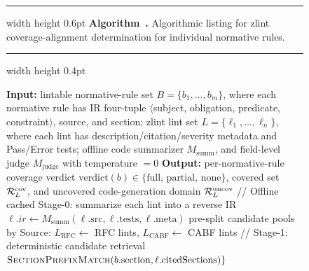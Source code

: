 %
\begin{figure}[tb]
\setlength{\parskip}{0pt}
\makeatletter
{}%
\makeatother
{}
\label{alg:coverage}
\hrule width \linewidth height 0.6pt\relax
\vspace{1pt}
\nointerlineskip
\noindent\textbf{Algorithm~\thealgorithm.} Algorithmic listing for zlint
coverage-alignment determination for individual normative rules.
\par
\vspace{1pt}
\nointerlineskip
\hrule width \linewidth height 0.4pt\relax
\nointerlineskip
\scriptsize
\begin{algorithmic}[1]
\Statex \textbf{Input:} lintable normative-rule set $B=\{b_1,\dots,b_m\}$, where each normative rule has
  IR four-tuple $\langle$subject, obligation, predicate, constraint$\rangle$,
  source, and section; zlint lint set $L=\{\ell_1,\dots,\ell_n\}$, where each lint has
  description/citation/severity metadata and Pass/Error tests; offline code
  summarizer $M_{\mathrm{summ}}$, and field-level judge $M_{\mathrm{judge}}$
  with temperature $=0$
\Statex \textbf{Output:} per-normative-rule coverage verdict $\mathrm{verdict}(b)\in\{\text{full, partial,
  none}\}$, covered set $\mathcal{R}_L^{\mathrm{cov}}$, and uncovered code-generation domain $\mathcal{R}_L^{\mathrm{uncov}}$
\Statex // Offline cached Stage-0: summarize each lint into a reverse
  IR
  \State $\ell.\mathit{ir} \gets M_{\mathrm{summ}}(\ell.\mathrm{src},
    \ell.\mathrm{tests}, \ell.\mathrm{meta})$
  \Statex {}
\EndFor
\State pre-split candidate pools by Source: $L_{\mathrm{RFC}}\gets$ RFC lints,\;
  $L_{\mathrm{CABF}}\gets$ CABF lints
  \State // Stage-1: deterministic candidate retrieval
    \Statex \hspace{\algorithmicindent}
      {$\textsc{SectionPrefixMatch}(b.\mathrm{section},\ell.\mathrm{citedSections})\}$}

\end{algorithmic}
\end{figure}
